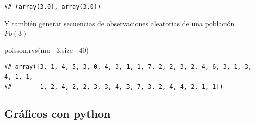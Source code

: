 \documentclass[]{book}
\newenvironment{Shaded}{\begin{snugshade}}{\end{snugshade}}
\newcommand{\DecValTok}[1]{\textcolor[rgb]{0.00,0.00,0.81}{#1}}
\newcommand{\NormalTok}[1]{#1}
\newcommand{\OperatorTok}[1]{\textcolor[rgb]{0.81,0.36,0.00}{\textbf{#1}}}
\begin{document}
\begin{verbatim}
## (array(3.0), array(3.0))
\end{verbatim}

Y también generar secuencias de observaciones aleatorias de una población \(Po(3)\)

\begin{Shaded}
\begin{Highlighting}[]
\NormalTok{poisson.rvs(mu}\OperatorTok{=}\DecValTok{3}\NormalTok{,size}\OperatorTok{=}\DecValTok{40}\NormalTok{)}
\end{Highlighting}
\end{Shaded}

\begin{verbatim}
## array([3, 1, 4, 5, 3, 0, 4, 3, 1, 1, 7, 2, 2, 3, 2, 4, 6, 3, 1, 3, 4, 1, 1,
##        1, 2, 4, 2, 2, 3, 3, 4, 3, 7, 3, 2, 4, 4, 2, 1, 1])
\end{verbatim}

\hypertarget{gruxe1ficos-con-python-2}{%
\subsection{Gráficos con python}\label{gruxe1ficos-con-python-2}}
\end{document}
